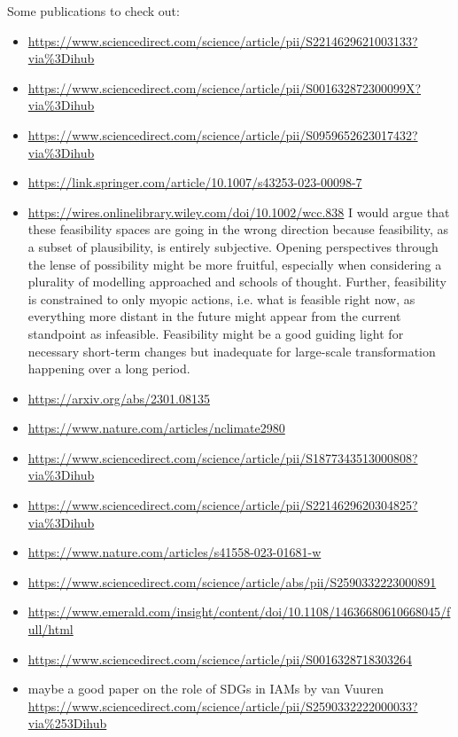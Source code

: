\documentclass{article}
\begin{document}
Some publications to check out:
\begin{itemize}
    \item \url{https://www.sciencedirect.com/science/article/pii/S2214629621003133?via%3Dihub}
    \item \url{https://www.sciencedirect.com/science/article/pii/S001632872300099X?via%3Dihub}
    \item \url{https://www.sciencedirect.com/science/article/pii/S0959652623017432?via%3Dihub}
    \item \url{https://link.springer.com/article/10.1007/s43253-023-00098-7}
    \item \url{https://wires.onlinelibrary.wiley.com/doi/10.1002/wcc.838} I would argue that these feasibility spaces are going in the wrong direction because feasibility, as a subset of plausibility, is entirely subjective. Opening perspectives through the lense of possibility might be more fruitful, especially when considering a plurality of modelling approached and schools of thought. Further, feasibility is constrained to only myopic actions, i.e. what is feasible right now, as everything more distant in the future might appear from the current standpoint as infeasible. Feasibility might be a good guiding light for necessary short-term changes but inadequate for large-scale transformation happening over a long period.
    \item \url{https://arxiv.org/abs/2301.08135}
    \item \url{https://www.nature.com/articles/nclimate2980}
    \item \url{https://www.sciencedirect.com/science/article/pii/S1877343513000808?via%3Dihub}
    \item \url{https://www.sciencedirect.com/science/article/pii/S2214629620304825?via%3Dihub}
    \item \url{https://www.nature.com/articles/s41558-023-01681-w}
    \item \url{https://www.sciencedirect.com/science/article/abs/pii/S2590332223000891}

    \item \url{https://www.emerald.com/insight/content/doi/10.1108/14636680610668045/full/html}
    \item \url{https://www.sciencedirect.com/science/article/pii/S0016328718303264}
    \item maybe a good paper on the role of SDGs in IAMs by van Vuuren \url{https://www.sciencedirect.com/science/article/pii/S2590332222000033?via%253Dihub}
\end{itemize}
\end{document}
